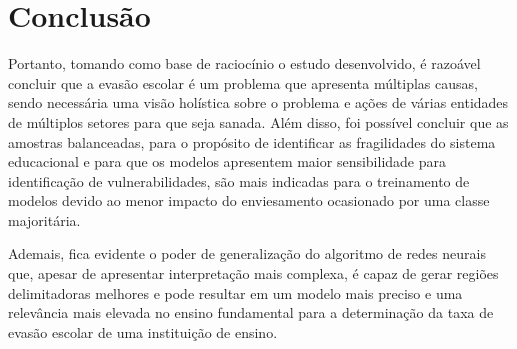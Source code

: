 \section{Conclusão}

\par Portanto, tomando como base de raciocínio o estudo desenvolvido, é razoável concluir que a evasão escolar é um problema que apresenta múltiplas causas, sendo necessária uma visão holística sobre o problema e ações de várias entidades de múltiplos setores para que seja sanada. Além disso, foi possível concluir que as amostras balanceadas, para o propósito de identificar as fragilidades do sistema educacional e para que os modelos apresentem maior sensibilidade para identificação de vulnerabilidades, são mais indicadas para o treinamento de modelos devido ao menor impacto do enviesamento ocasionado por uma classe majoritária.

\par Ademais, fica evidente o poder de generalização do algoritmo de redes neurais que, apesar de apresentar interpretação mais complexa, é capaz de gerar regiões delimitadoras melhores e pode resultar em um modelo mais preciso e uma relevância mais elevada no ensino fundamental para a determinação da taxa de evasão escolar de uma instituição de ensino.

